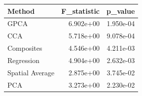 \begin{tabular}{lrr}
\toprule
Method & F_statistic & p_value \\
\midrule
GPCA & 6.902e+00 & 1.950e-04 \\
CCA & 5.718e+00 & 9.078e-04 \\
Composites & 4.546e+00 & 4.211e-03 \\
Regression & 4.904e+00 & 2.632e-03 \\
Spatial Average & 2.875e+00 & 3.745e-02 \\
PCA & 3.273e+00 & 2.230e-02 \\
\bottomrule
\end{tabular}

